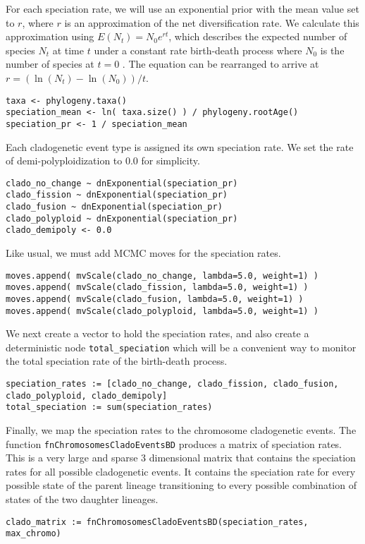 For each speciation rate, we will use an exponential prior with the mean value set to $r$, where $r$ is an approximation of the net diversification rate.
We calculate this approximation using $E(N_t) = N_0 e^{rt}$,
which describes the expected number of species $N_t$ 
at time $t$ under a constant rate birth-death process
where $N_0$ is the number of species at $t=0$ \citep{nee94}. 
The equation can be rearranged to arrive at
$r = ( \ln(N_t) - \ln(N_0) ) / t$.
{\tt \begin{snugshade*}
\begin{lstlisting}
taxa <- phylogeny.taxa()
speciation_mean <- ln( taxa.size() ) / phylogeny.rootAge()
speciation_pr <- 1 / speciation_mean
\end{lstlisting}
\end{snugshade*}
}
Each cladogenetic event type is assigned its own speciation rate.
We set the rate of demi-polyploidization to 0.0 for simplicity.
{\tt \begin{snugshade*}
\begin{lstlisting}
clado_no_change ~ dnExponential(speciation_pr)
clado_fission ~ dnExponential(speciation_pr)
clado_fusion ~ dnExponential(speciation_pr)
clado_polyploid ~ dnExponential(speciation_pr)
clado_demipoly <- 0.0
\end{lstlisting}
\end{snugshade*}
}
Like usual, we must add MCMC moves for the speciation rates.
{\tt \begin{snugshade*}
\begin{lstlisting}
moves.append( mvScale(clado_no_change, lambda=5.0, weight=1) )
moves.append( mvScale(clado_fission, lambda=5.0, weight=1) )
moves.append( mvScale(clado_fusion, lambda=5.0, weight=1) )
moves.append( mvScale(clado_polyploid, lambda=5.0, weight=1) )
\end{lstlisting}
\end{snugshade*}
}
We next create a vector to hold the speciation rates,
and also create a deterministic node \texttt{total\_speciation}
which will be a convenient way to monitor the total speciation rate
of the birth-death process.
{\tt \begin{snugshade*}
\begin{lstlisting}
speciation_rates := [clado_no_change, clado_fission, clado_fusion, clado_polyploid, clado_demipoly]
total_speciation := sum(speciation_rates)
\end{lstlisting}
\end{snugshade*}
}
Finally, we map the speciation rates to the chromosome cladogenetic events.
The function \texttt{fnChromosomesCladoEventsBD}
produces a matrix of speciation rates. This is a very
large and sparse 3 dimensional matrix that contains the speciation rates 
for all possible cladogenetic events.
It contains the speciation rate for
every possible state of the parent lineage transitioning to every possible
combination of states of the two daughter lineages.
{\tt \begin{snugshade*}
\begin{lstlisting}
clado_matrix := fnChromosomesCladoEventsBD(speciation_rates, max_chromo)
\end{lstlisting}
\end{snugshade*}
}

